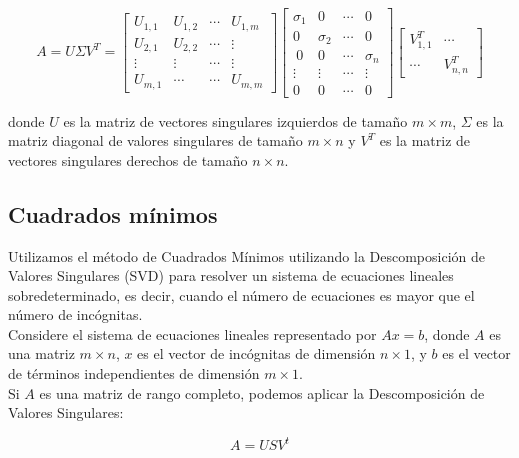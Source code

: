 \documentclass[12pt,a4]{article} %
\begin{document}
\begin{equation}
    A = U \Sigma V^T= \begin{bmatrix}
    U_{1,1} & U_{1,2} & \cdots & U_{1,m} \\
    U_{2,1} & U_{2,2} & \cdots & \vdots \\
    \vdots & \vdots & \cdots & \vdots \\
    U_{m,1} & \cdots & \cdots & U_{m,m}
    \end{bmatrix}\begin{bmatrix}
    \sigma_1 & 0  &\cdots &0\\
    0 & \sigma_2  &\cdots &0\\\
    0 & 0 &\cdots &\sigma_ n\\
    \vdots & \vdots &\cdots &\vdots\\
    0&0&\cdots &0
    \end{bmatrix}\begin{bmatrix}
    V^{T}_{1,1} & \cdots \\
    \cdots & V^{T}_{n,n}
    \end{bmatrix}
    \label{eq:svd}
\end{equation}




donde \(U\) es la matriz de vectores singulares izquierdos de tamaño \(m \times m\), \(\Sigma\) es la matriz diagonal de valores singulares de tamaño \(m \times n\) y \(V^T\) es la matriz de vectores singulares derechos de tamaño \(n \times n\).
\subsection{Cuadrados mínimos}
\label{cuads_mins}

Utilizamos el método de Cuadrados Mínimos utilizando la Descomposición de Valores Singulares (SVD) para resolver un sistema de ecuaciones lineales sobredeterminado, es decir, cuando el número de ecuaciones es mayor que el número de incógnitas.
\\

Considere el sistema de ecuaciones lineales representado por $Ax = b$, donde $A$ es una matriz $m \times n$, $x$ es el vector de incógnitas de dimensión $n \times 1$, y $b$ es el vector de términos independientes de dimensión $m \times 1$.
\\

Si $A$ es una matriz de rango completo, podemos aplicar la Descomposición de Valores Singulares:

\[
A = USV^t
\]
\end{document}
